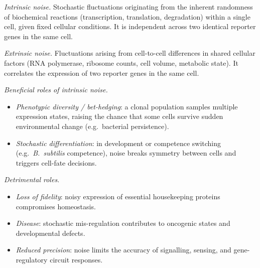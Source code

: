\documentclass[11pt]{article}
\begin{document}
\textit{Intrinsic noise.} Stochastic fluctuations originating from the inherent randomness of biochemical reactions (transcription, translation, degradation) within a single cell, given fixed cellular conditions. It is independent across two identical reporter genes in the same cell.

\textit{Extrinsic noise.} Fluctuations arising from cell-to-cell differences in shared cellular factors (RNA polymerase, ribosome counts, cell volume, metabolic state). It correlates the expression of two reporter genes in the same cell.

\textit{Beneficial roles of intrinsic noise.}
\begin{itemize}
\item \emph{Phenotypic diversity / bet-hedging}: a clonal population samples multiple expression states, raising the chance that some cells survive sudden environmental change (e.g.\ bacterial persistence).
\item \emph{Stochastic differentiation}: in development or competence switching (e.g.\ \emph{B.\ subtilis} competence), noise breaks symmetry between cells and triggers cell-fate decisions.
\end{itemize}

\textit{Detrimental roles.}
\begin{itemize}
\item \emph{Loss of fidelity}: noisy expression of essential housekeeping proteins compromises homeostasis.
\item \emph{Disease}: stochastic mis-regulation contributes to oncogenic states and developmental defects.
\item \emph{Reduced precision}: noise limits the accuracy of signalling, sensing, and gene-regulatory circuit responses.
\end{itemize}
\end{document}
